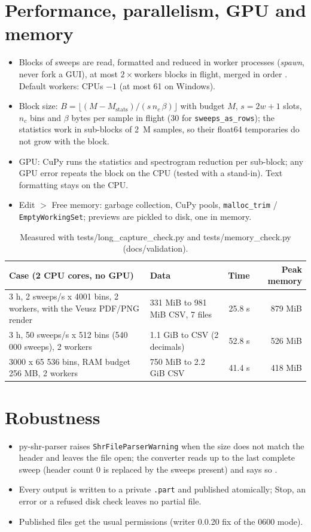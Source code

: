 \documentclass[11pt,a4paper]{article}
\newcommand{\code}[1]{\texttt{#1}}
\begin{document}
\section{Performance, parallelism, GPU and memory}
\begin{itemize}[nosep]
\item Blocks of sweeps are read, formatted and reduced in worker processes (\emph{spawn}, never fork a GUI),
      at most $2\times$workers blocks in flight, merged in order \cite{r8}. Default workers: CPUs $-1$
      (at most 61 on Windows).
\item Block size: $B=\lfloor (M-M_\mathrm{stats})/(s\,n_c\,\beta)\rfloor$ with budget $M$, $s=2w+1$ slots,
      $n_c$ bins and $\beta$ bytes per sample in flight (30 for \code{sweeps\_as\_rows}); the statistics
      work in sub-blocks of 2~M samples, so their float64 temporaries do not grow with the block.
\item GPU: CuPy \cite{r9} runs the statistics and spectrogram reduction per sub-block; any GPU error repeats
      the block on the CPU (tested with a stand-in). Text formatting stays on the CPU.
\item Edit $>$ Free memory: garbage collection, CuPy pools, \code{malloc\_trim} / \code{EmptyWorkingSet};
      previews are pickled to disk, one in memory.
\end{itemize}
\begin{longtable}{p{6.2cm}p{4.2cm}rr}
\caption{Measured with tests/long\_capture\_check.py and tests/memory\_check.py (docs/validation).}\\
\toprule
\textbf{Case (2 CPU cores, no GPU)} & \textbf{Data} & \textbf{Time} & \textbf{Peak memory}\\
\midrule
\endhead
3 h, 2 sweeps/s x 4001 bins, 2 workers, with the Veusz PDF/PNG render & 331 MiB to 981 MiB CSV, 7 files & 25.8 s & 879 MiB\\
3 h, 50 sweeps/s x 512 bins (540 000 sweeps), 2 workers & 1.1 GiB to CSV (2 decimals) & 52.8 s & 526 MiB\\
3000 x 65 536 bins, RAM budget 256 MB, 2 workers & 750 MiB to 2.2 GiB CSV & 41.4 s & 418 MiB\\
\bottomrule
\end{longtable}

\section{Robustness}
\begin{itemize}[nosep]
\item py-shr-parser raises \code{ShrFileParserWarning} when the size does not match the header and leaves
      the file open; the converter reads up to the last complete sweep (header count 0 is replaced by the
      sweeps present) and says so \cite{r2}.
\item Every output is written to a private \code{.part} and published atomically; Stop, an error or a
      refused disk check leaves no partial file.
\item Published files get the usual permissions (writer 0.0.20 fix of the 0600 mode).
\end{itemize}
\end{document}

